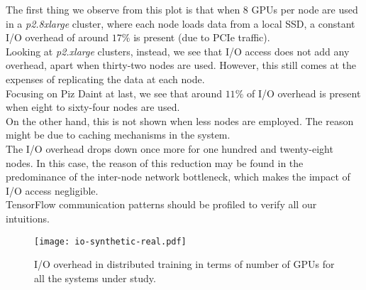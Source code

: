 The first thing we observe from this plot is that when 8 GPUs per node are used in a \textit{p2.8xlarge} cluster, where each node loads data from a local SSD, a constant I/O overhead of around $17\%$ is present (due to PCIe traffic).\\

Looking at \textit{p2.xlarge} clusters, instead, we see that I/O access does not add any overhead, apart when thirty-two nodes are used.
However, this still comes at the expenses of replicating the data at each node.\\

Focusing on Piz Daint at last, we see that around $11\%$ of I/O overhead is present when eight to sixty-four nodes are used.\\
On the other hand, this is not shown when less nodes are employed.
The reason might be due to caching mechanisms in the system.\\
The I/O overhead drops down once more for one hundred and twenty-eight nodes.
In this case, the reason of this reduction may be found in the predominance of the inter-node network bottleneck, which makes the impact of I/O access negligible.\\

TensorFlow communication patterns should be profiled to verify all our intuitions.

\begin{figure}[t]
  \centering
  \texttt{[image: io-synthetic-real.pdf]}
  \vspace{-0.85cm}
  \caption{I/O overhead in distributed training in terms of number of GPUs for all the systems under study.} 
  \label{fig:io}
\end{figure}
\vspace{-0.5cm}